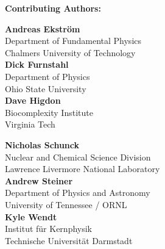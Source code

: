 {\bf \large Contributing Authors:}
\vspace{5mm}

\begin{minipage}[t]{0.5\linewidth}

\textbf{Andreas Ekström}\\
Department of Fundamental Physics\\
Chalmers University of Technology\\

\textbf{Dick Furnstahl}\\
Department of Physics\\ 
Ohio State University\\

\textbf{Dave Higdon}\\
Biocomplexity Institute\\
Virginia Tech


\end{minipage}
\hfill
\begin{minipage}[t]{0.5\linewidth}

{\bf Nicholas Schunck}\\
Nuclear and Chemical Science Division \\
Lawrence Livermore National Laboratory\\

{\bf Andrew Steiner}\\
Department of Physics and Astronomy\\
University of Tennessee / ORNL\\

{\bf Kyle Wendt}\\
Institut für Kernphysik\\
Technische Universität Darmstadt \\

\end{minipage}

